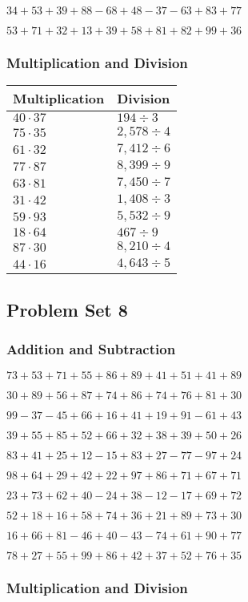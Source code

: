 \(34+53+39+88-68+48-37-63+83+77\)

\(53+71+32+13+39+58+81+82+99+36\)

\hypertarget{multiplication-and-division-47}{%
\subsubsection{Multiplication and
Division}\label{multiplication-and-division-47}}

\begin{longtable}[]{@{}ll@{}}
\toprule
Multiplication & Division\tabularnewline
\midrule
\endhead
\(40\cdot37\) & \(194÷3\)\tabularnewline
\(75\cdot35\) & \(2,578÷4\)\tabularnewline
\(61\cdot32\) & \(7,412÷6\)\tabularnewline
\(77\cdot87\) & \(8,399÷9\)\tabularnewline
\(63\cdot81\) & \(7,450÷7\)\tabularnewline
\(31\cdot42\) & \(1,408÷3\)\tabularnewline
\(59\cdot93\) & \(5,532÷9\)\tabularnewline
\(18\cdot64\) & \(467÷9\)\tabularnewline
\(87\cdot30\) & \(8,210÷4\)\tabularnewline
\(44\cdot16\) & \(4,643÷5\)\tabularnewline
\bottomrule
\end{longtable}

\hypertarget{problem-set-8-1}{%
\subsection{Problem Set 8}\label{problem-set-8-1}}

\hypertarget{addition-and-subtraction-48}{%
\subsubsection{Addition and
Subtraction}\label{addition-and-subtraction-48}}

\(73+53+71+55+86+89+41+51+41+ 89\)

\(30+89+56+87+74+86+74+76+81+30\)

\(99-37-45+66+16+41+19+91-61+43\)

\(39+55+85+52+66+32+38+39+50+26\)

\(83+41+25+12-15+83+27-77-97+24\)

\(98+64+29+42+22+97+86+71+67+71\)

\(23+73+62+40-24+38-12-17+69+72\)

\(52+18+16+58+74+36+21+89+73+30\)

\(16+66+81-46+40-43-74+61+90+77\)

\(78+27+55+99+86+42+37+52+76+35\)

\hypertarget{multiplication-and-division-48}{%
\subsubsection{Multiplication and
Division}\label{multiplication-and-division-48}}

